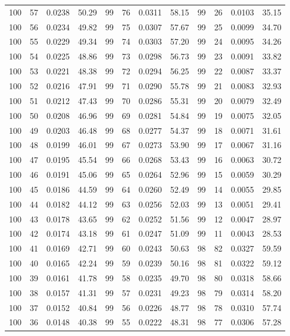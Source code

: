 \begin{tabular}{llll|llll|llll}
100 & 57 & 0.0238 & 50.29 & 99 & 76 & 0.0311 & 58.15 & 99 & 26 & 0.0103 & 35.15\\
100 & 56 & 0.0234 & 49.82 & 99 & 75 & 0.0307 & 57.67 & 99 & 25 & 0.0099 & 34.70\\
100 & 55 & 0.0229 & 49.34 & 99 & 74 & 0.0303 & 57.20 & 99 & 24 & 0.0095 & 34.26\\
100 & 54 & 0.0225 & 48.86 & 99 & 73 & 0.0298 & 56.73 & 99 & 23 & 0.0091 & 33.82\\
100 & 53 & 0.0221 & 48.38 & 99 & 72 & 0.0294 & 56.25 & 99 & 22 & 0.0087 & 33.37\\
100 & 52 & 0.0216 & 47.91 & 99 & 71 & 0.0290 & 55.78 & 99 & 21 & 0.0083 & 32.93\\
100 & 51 & 0.0212 & 47.43 & 99 & 70 & 0.0286 & 55.31 & 99 & 20 & 0.0079 & 32.49\\
100 & 50 & 0.0208 & 46.96 & 99 & 69 & 0.0281 & 54.84 & 99 & 19 & 0.0075 & 32.05\\
100 & 49 & 0.0203 & 46.48 & 99 & 68 & 0.0277 & 54.37 & 99 & 18 & 0.0071 & 31.61\\
100 & 48 & 0.0199 & 46.01 & 99 & 67 & 0.0273 & 53.90 & 99 & 17 & 0.0067 & 31.16\\
100 & 47 & 0.0195 & 45.54 & 99 & 66 & 0.0268 & 53.43 & 99 & 16 & 0.0063 & 30.72\\
100 & 46 & 0.0191 & 45.06 & 99 & 65 & 0.0264 & 52.96 & 99 & 15 & 0.0059 & 30.29\\
100 & 45 & 0.0186 & 44.59 & 99 & 64 & 0.0260 & 52.49 & 99 & 14 & 0.0055 & 29.85\\
100 & 44 & 0.0182 & 44.12 & 99 & 63 & 0.0256 & 52.03 & 99 & 13 & 0.0051 & 29.41\\
100 & 43 & 0.0178 & 43.65 & 99 & 62 & 0.0252 & 51.56 & 99 & 12 & 0.0047 & 28.97\\
100 & 42 & 0.0174 & 43.18 & 99 & 61 & 0.0247 & 51.09 & 99 & 11 & 0.0043 & 28.53\\
100 & 41 & 0.0169 & 42.71 & 99 & 60 & 0.0243 & 50.63 & 98 & 82 & 0.0327 & 59.59\\
100 & 40 & 0.0165 & 42.24 & 99 & 59 & 0.0239 & 50.16 & 98 & 81 & 0.0322 & 59.12\\
100 & 39 & 0.0161 & 41.78 & 99 & 58 & 0.0235 & 49.70 & 98 & 80 & 0.0318 & 58.66\\
100 & 38 & 0.0157 & 41.31 & 99 & 57 & 0.0231 & 49.23 & 98 & 79 & 0.0314 & 58.20\\
100 & 37 & 0.0152 & 40.84 & 99 & 56 & 0.0226 & 48.77 & 98 & 78 & 0.0310 & 57.74\\
100 & 36 & 0.0148 & 40.38 & 99 & 55 & 0.0222 & 48.31 & 98 & 77 & 0.0306 & 57.28\\

\end{tabular}
